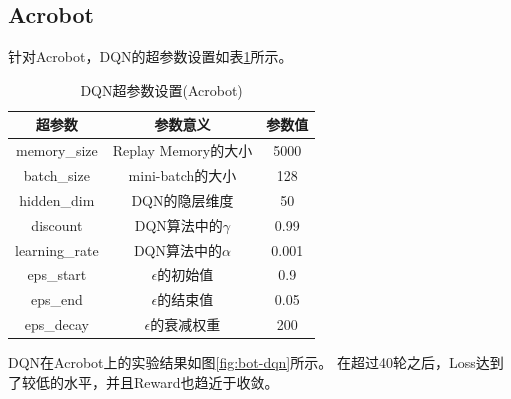 \documentclass[a4paper,UTF8]{article}
\theoremstyle{definition}
\begin{document}
\subsection*{Acrobot}

针对Acrobot，DQN的超参数设置如表\ref{tab:bot-dqn}所示。

\begin{table}[H]
	\centering
	\begin{tabular}{ccc}
		\toprule
		超参数 & 参数意义 & 参数值 \\
		\midrule
		memory\_size & Replay Memory的大小 & 5000 \\
		batch\_size & mini-batch的大小 & 128 \\
		hidden\_dim & DQN的隐层维度 & 50 \\
		discount & DQN算法中的$\gamma$ & 0.99 \\
		learning\_rate & DQN算法中的$\alpha$ & 0.001 \\
		eps\_start & $\epsilon$的初始值 & 0.9 \\
		eps\_end & $\epsilon$的结束值 & 0.05 \\
		eps\_decay & $\epsilon$的衰减权重 & 200 \\
		\bottomrule
	\end{tabular}
	\caption{DQN超参数设置(Acrobot)}\label{tab:bot-dqn}
\end{table}

DQN在Acrobot上的实验结果如图\ref{fig:bot-dqn}所示。
在超过40轮之后，Loss达到了较低的水平，并且Reward也趋近于收敛。
\end{document}
